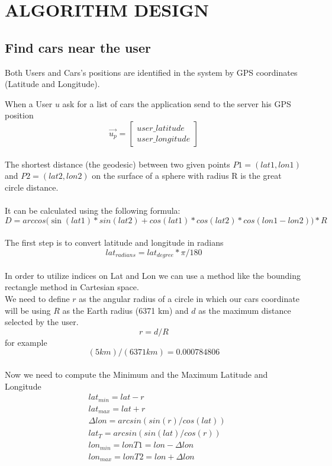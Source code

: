 \section{ALGORITHM DESIGN}
\subsection{Find cars near the user}
Both Users and Cars's positions are identified in the system by GPS coordinates (Latitude and Longitude).


\noindent When a User $u$ ask for a list of cars the application send to the server his GPS position \begin{equation}
\vec{u_p} =\begin{bmatrix}user\_latitude \\ user\_longitude\end{bmatrix}
\end{equation}
\\
\noindent The shortest distance (the geodesic) between two given points $P1=(lat1, lon1)$ and $P2=(lat2, lon2)$ on the surface of a sphere with radius R is the great circle distance. 
\\\\
It can be calculated using the following formula:\\
\begin{equation}
D = arccos\Big(
\sin(lat1) * sin(lat2) + cos(lat1) * cos(lat2) * cos(lon1 - lon2)
\Big)* R
\end{equation}
\\
\noindent The first step is to convert latitude and longitude in radians\\
\begin{equation}
lat_{radians} = lat_{degree} * \pi / 180
\end{equation}
\\
In order to utilize indices on Lat and Lon we can use a method like the bounding rectangle method in Cartesian space.\\
\noindent We need to define $r$ as the angular radius of a circle in which our cars coordinate will be using $R$ as the Earth radius (6371 km) and $d$ as the maximum distance selected by the user.
\begin{equation}
	 r = d/R  
\end{equation}
for example $$ (5 km)/(6371 km) = 0.000784806$$
\\
\noindent Now we need to compute the Minimum and the Maximum Latitude and Longitude
\begin{eqnarray}
&lat_{min} = lat - r  \\
&lat_{max} = lat + r  \\
&\Delta lon = arcsin(sin(r)/cos(lat))\\
&lat_T = arcsin(sin(lat)/cos(r))\\
&lon_{min} = lonT1 = lon - \Delta lon  \\
&lon_{max} = lonT2 = lon + \Delta lon 
\end{eqnarray}
